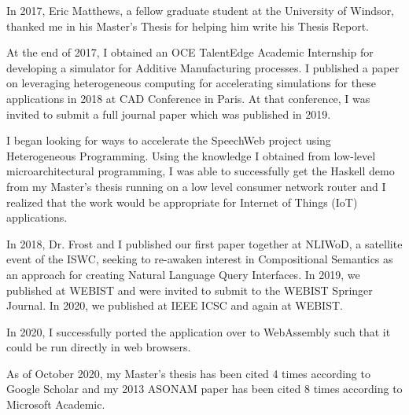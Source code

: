 \documentclass[../main.tex]{subfiles}
\begin{document}
\begin{refsection}
    In 2017, Eric Matthews, a fellow graduate student at the University of Windsor, thanked me in his Master's Thesis for helping him write his Thesis Report.

    At the end of 2017, I obtained an OCE TalentEdge Academic Internship for developing a simulator for Additive Manufacturing processes.  I published a paper on leveraging heterogeneous computing for accelerating simulations for these applications in 2018 at CAD Conference in Paris.  At that conference, I was invited to submit a full journal paper which was published in 2019. %

    I began looking for ways to accelerate the SpeechWeb project using Heterogeneous Programming.
    Using the knowledge I obtained from low-level microarchitectural programming, I was able to successfully get the Haskell demo from my Master's thesis running on a low level consumer network router and I realized that the work would be appropriate for Internet of Things (IoT) applications.

    In 2018, Dr. Frost and I published our first paper together at NLIWoD, a satellite event of the ISWC, seeking to re-awaken interest in Compositional Semantics as an approach for creating Natural Language Query Interfaces.  In 2019, we published at WEBIST and were invited to submit to the WEBIST Springer Journal.  In 2020, we published at IEEE ICSC and again at WEBIST.

    In 2020, I successfully ported the application over to WebAssembly such that it could be run directly in web browsers.

    As of October 2020, my Master's thesis has been cited 4 times according to Google Scholar and my 2013 ASONAM paper has been cited 8 times according to Microsoft Academic.



\end{refsection}
\end{document}
